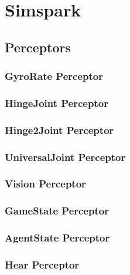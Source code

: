 \chapter{Simspark}

\section{Perceptors}



\subsection{GyroRate Perceptor}

\subsection{HingeJoint Perceptor}

\subsection{Hinge2Joint Perceptor}

\subsection{UniversalJoint Perceptor} 


\subsection{Vision Perceptor}



\subsection{GameState Perceptor}
\subsection{AgentState Perceptor}
\subsection{Hear Perceptor}

